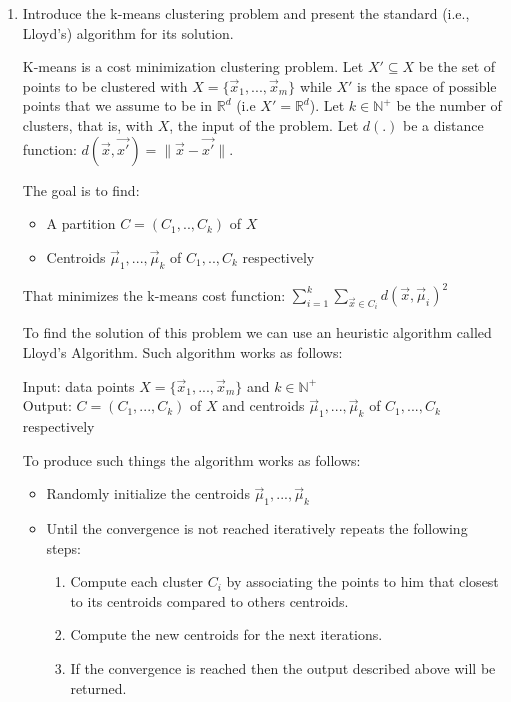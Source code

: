 \documentclass[a4paper,11pt,oneside]{book}
\begin{document}
\begin{enumerate}
\item Introduce the k-means clustering problem and present the standard (i.e., Lloyd's) algorithm for its solution.
\begin{solution}
    K-means is a cost minimization clustering problem. Let $X' \subseteq X$ be the set of points to be clustered with $X = \{\vec{x}_1,...,\vec{x}_m\}$ while $X'$ is the space of possible points that we assume to be in $\mathbb{R}^d$ (i.e $X' = \mathbb{R}^d$).
    Let $k \in \mathbb{N}^+$ be the number of clusters, that is, with $X$, the input of the problem.
    Let $d(.)$ be a distance function: $d(\vec{x},\vec{x'}) = \|\vec{x} - \vec{x'}\|$.
    
    The goal is to find:
    \begin{itemize}
    \item A partition $C = (C_1,..,C_k)$ of $X$
    \item Centroids $\vec{\mu}_1,...,\vec{\mu}_k$ of $C_1,..,C_k$ respectively
    \end{itemize}
    
    That minimizes the k-means cost function: $\sum_{i=1}^k \sum_{\vec{x}\in C_i} d(\vec{x},\vec{\mu}_i)^2$
    
    To find the solution of this problem we can use an heuristic algorithm called Lloyd's Algorithm. Such algorithm works as follows:
    
    Input: data points $X = \{\vec{x}_1,...,\vec{x}_m\}$ and $k \in \mathbb{N}^+$\\
    Output: $C = (C_1,...,C_k)$ of $X$ and centroids $\vec{\mu}_1,...,\vec{\mu}_k$ of $C_1,...,C_k$ respectively
    
    To produce such things the algorithm works as follows:
    \begin{itemize}
    \item Randomly initialize the centroids $\vec{\mu}_1,...,\vec{\mu}_k$
    \item Until the convergence is not reached iteratively repeats the following steps:
       \begin{enumerate}
       \item Compute each cluster $C_i$ by associating the points to him that closest to its centroids compared to others centroids.
       \item Compute the new centroids for the next iterations.
       \item If the convergence is reached then the output described above will be returned.
       \end{enumerate}
    \end{itemize}
    

\end{solution}
\end{enumerate}
\end{document}
